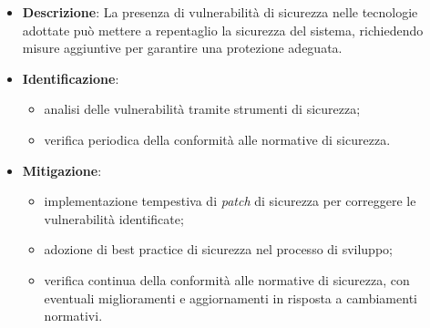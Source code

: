 \label{risk:problemi di sicurezza delle tecnologie utilizzate}
\begin{itemize}
	\item \textbf{Descrizione}: La presenza di vulnerabilità di sicurezza nelle tecnologie 
								adottate può mettere a repentaglio la sicurezza del sistema, 
								richiedendo misure aggiuntive per garantire una protezione adeguata.
	\item \textbf{Identificazione}:
	      \begin{itemize}
		      \item analisi delle vulnerabilità tramite strumenti di sicurezza;
		      
			  \item verifica periodica della conformità alle normative di sicurezza.
	      \end{itemize}

	\item \textbf{Mitigazione}:
	      \begin{itemize}
		      \item implementazione tempestiva di \textit{patch} di sicurezza per correggere le vulnerabilità identificate;

		      \item adozione di best practice di sicurezza nel processo di sviluppo;
		      
			  \item verifica continua della conformità alle normative di sicurezza, con 
			  		eventuali miglioramenti e aggiornamenti in risposta a cambiamenti normativi.
	      \end{itemize}
\end{itemize}
